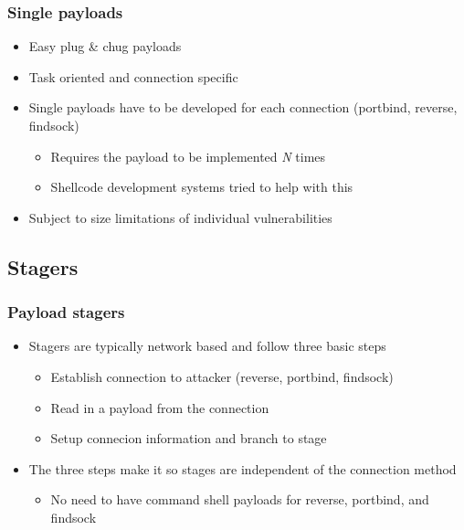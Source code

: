 \documentclass{beamer}
\newenvironment{sitemize}{\vspace{1mm}\begin{itemize}\itemsep 4pt\small}{\end{itemize}}
\begin{document}
\begin{frame}[t]
    \frametitle{Single payloads}

    \begin{sitemize}
        \item Easy plug \& chug payloads

        \pause
        \item Task oriented and connection specific

        \pause
        \item Single payloads have to be developed for each
            connection (portbind, reverse, findsock)
        \begin{sitemize}
            \item Requires the payload to be implemented \textit{N} times
	    \item Shellcode development systems tried to help with this
        \end{sitemize}

        \pause
        \item Subject to size limitations of individual
        vulnerabilities
    \end{sitemize}
\end{frame}


\subsection{Stagers}
\begin{frame}[t]
    \frametitle{Payload stagers}

    \begin{sitemize}
        \item Stagers are typically network based and follow three
        basic steps
        \begin{sitemize}
            \item Establish connection to attacker (reverse,
            portbind, findsock)
            \item Read in a payload from the connection
            \item Setup connecion information and branch to stage
        \end{sitemize}

        \pause
        \item The three steps make it so stages are independent of the
	connection method
        \begin{sitemize}
            \item No need to have command shell payloads for
            reverse, portbind, and findsock
        \end{sitemize}
    \end{sitemize}
\end{frame}
\end{document}
